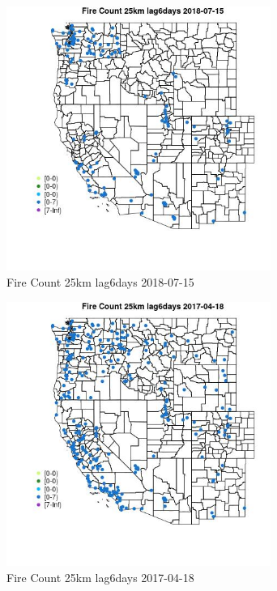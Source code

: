 \begin{figure} 
\centering  
\includegraphics[width=0.77\textwidth]{Code_Outputs/Report_ML_input_PM25_Step4_part_e_de_duplicated_aves_compiled_2019-05-21wNAs_MapObsFire_Count_25km_lag6days2018-07-15.jpg} 
\caption{\label{fig:Report_ML_input_PM25_Step4_part_e_de_duplicated_aves_compiled_2019-05-21wNAsMapObsFire_Count_25km_lag6days2018-07-15}Fire Count 25km lag6days 2018-07-15} 
\end{figure} 
 

\begin{figure} 
\centering  
\includegraphics[width=0.77\textwidth]{Code_Outputs/Report_ML_input_PM25_Step4_part_e_de_duplicated_aves_compiled_2019-05-21wNAs_MapObsFire_Count_25km_lag6days2017-04-18.jpg} 
\caption{\label{fig:Report_ML_input_PM25_Step4_part_e_de_duplicated_aves_compiled_2019-05-21wNAsMapObsFire_Count_25km_lag6days2017-04-18}Fire Count 25km lag6days 2017-04-18} 
\end{figure} 
 

